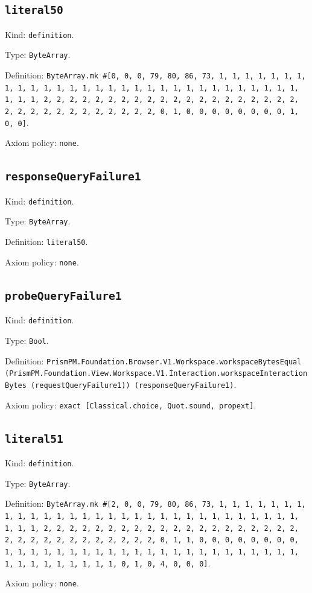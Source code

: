 \documentclass[11pt]{article}
\begin{document}
\subsection*{\texttt{literal50}}
\noindent Kind: \texttt{definition}.\par
\noindent Type: \texttt{ByteArray}.\par
\noindent Definition: \texttt{ByteArray.mk \#[0, 0, 0, 79, 80, 86, 73, 1, 1, 1, 1, 1, 1, 1, 1, 1, 1, 1, 1, 1, 1, 1, 1, 1, 1, 1, 1, 1, 1, 1, 1, 1, 1, 1, 1, 1, 1, 1, 1, 1, 2, 2, 2, 2, 2, 2, 2, 2, 2, 2, 2, 2, 2, 2, 2, 2, 2, 2, 2, 2, 2, 2, 2, 2, 2, 2, 2, 2, 2, 2, 2, 2, 0, 1, 0, 0, 0, 0, 0, 0, 0, 0, 1, 0, 0]}.\par
\noindent Axiom policy: \texttt{none}.\par
\subsection*{\texttt{responseQueryFailure1}}
\noindent Kind: \texttt{definition}.\par
\noindent Type: \texttt{ByteArray}.\par
\noindent Definition: \texttt{literal50}.\par
\noindent Axiom policy: \texttt{none}.\par
\subsection*{\texttt{probeQueryFailure1}}
\noindent Kind: \texttt{definition}.\par
\noindent Type: \texttt{Bool}.\par
\noindent Definition: \texttt{PrismPM.Foundation.Browser.V1.Workspace.workspaceBytesEqual (PrismPM.Foundation.View.Workspace.V1.Interaction.workspaceInteractionBytes (requestQueryFailure1)) (responseQueryFailure1)}.\par
\noindent Axiom policy: \texttt{exact [Classical.choice, Quot.sound, propext]}.\par
\subsection*{\texttt{literal51}}
\noindent Kind: \texttt{definition}.\par
\noindent Type: \texttt{ByteArray}.\par
\noindent Definition: \texttt{ByteArray.mk \#[2, 0, 0, 79, 80, 86, 73, 1, 1, 1, 1, 1, 1, 1, 1, 1, 1, 1, 1, 1, 1, 1, 1, 1, 1, 1, 1, 1, 1, 1, 1, 1, 1, 1, 1, 1, 1, 1, 1, 1, 2, 2, 2, 2, 2, 2, 2, 2, 2, 2, 2, 2, 2, 2, 2, 2, 2, 2, 2, 2, 2, 2, 2, 2, 2, 2, 2, 2, 2, 2, 2, 2, 0, 1, 1, 0, 0, 0, 0, 0, 0, 0, 0, 1, 1, 1, 1, 1, 1, 1, 1, 1, 1, 1, 1, 1, 1, 1, 1, 1, 1, 1, 1, 1, 1, 1, 1, 1, 1, 1, 1, 1, 1, 1, 1, 0, 1, 0, 4, 0, 0, 0]}.\par
\noindent Axiom policy: \texttt{none}.\par
\end{document}
